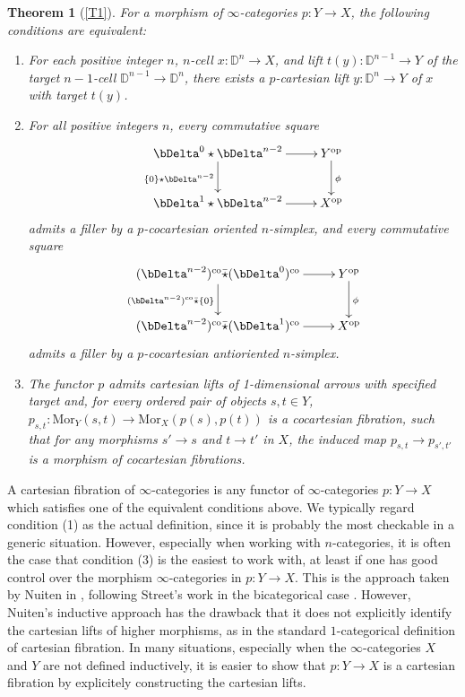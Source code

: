 \documentclass[10pt,oneside]{article}
\numberwithin{equation}{section} %
\numberwithin{figure}{section} %
\theoremstyle{plain}
\newtheorem{theorem}{Theorem}[subsection]
\theoremstyle{definition}
\newcommand{\bD}{{\mathbb D}}
\newcommand{\op}{\mathrm{op}}
\newcommand{\co}{\mathrm{co}}
\newcommand{\Mor}{{\mathrm{Mor}}}
\begin{document}
\begin{theorem}[{\cref{T1}}]
For a morphism of $\infty$-categories $p:Y\to X$, the following conditions are equivalent:
\begin{enumerate}[\normalfont(1)]\setlength{\itemsep}{-2pt}
\item[\em{(1)}]
For each positive integer $n$, $n$-cell $x:\bD^n\to X$, and lift $t(y):\bD^{n-1}\to Y$ of the target $n-1$-cell $\bD^{n-1}\to\bD^n$, there exists a $p$-cartesian lift $y:\bD^n\to Y$ of $x$ with target $t(y)$.
\item[\em{(2)}]
For all positive integers $n$, every commutative square
\begin{equation}
\begin{xy}
\xymatrix{
\bDelta^0 \star \bDelta^{n-2} \ar[d]_{\{0\}\star \bDelta^{n-2}} \ar[r]
& Y^{\op} \ar[d]^\phi
\\ 
\bDelta^1 \star \bDelta^{n-2} \ar[r] & X^{\op}
}
\end{xy}\end{equation}
admits a filler by a $p$-cocartesian oriented $n$-simplex, and every commutative square
\begin{equation}\label{filler1}
\begin{xy}
\xymatrix{(\bDelta^{n-2})^\co \bar{\star} (\bDelta^0)^\co \ar[d]_{(\bDelta^{n-2})^\co \bar{\star} \{0\}} \ar[r]
& Y^{\op} \ar[d]^\phi
\\ 
(\bDelta^{n-2})^\co \bar{\star} (\bDelta^1)^\co \ar[r] & X^{\op}
}
\end{xy}\end{equation}
admits a filler by a $p$-cocartesian antioriented $n$-simplex.
\item[\em{(3)}]
The functor $p$ admits cartesian lifts of 1-dimensional arrows with specified target and, for every ordered pair of objects $s, t \in Y$, $p_{s,t}:\Mor_Y(s,t)\to\Mor_X(p(s),p(t))$ is a cocartesian fibration, such that for any morphisms $s'\to s$ and $t\to t'$ in $X$, the induced map $p_{s,t}\to p_{s',t'}$ is a morphism of cocartesian fibrations.
\end{enumerate}
\end{theorem}
A cartesian fibration of $\infty$-categories is any functor of $\infty$-categories $p:Y\to X$ which satisfies one of the equivalent conditions above.
We typically regard condition (1) as the actual definition, since it is probably the most checkable in a generic situation.
However, especially when working with $n$-categories, it is often the case that condition (3) is the easiest to work with, at least if one has good control over the morphism $\infty$-categories in $p:Y\to X$.
This is the approach taken by Nuiten in \cite{nuiten2023straightening}, following Street's work in the bicategorical case \cite{street1980fibrations}.
However, Nuiten's inductive approach has the drawback that it does not explicitly identify the cartesian lifts of higher morphisms, as in the standard $1$-categorical definition of cartesian fibration.
In many situations, especially when the $\infty$-categories $X$ and $Y$ are not defined inductively, it is easier to show that $p:Y\to X$ is a cartesian fibration by explicitely constructing the cartesian lifts.
\end{document}
